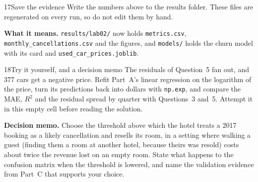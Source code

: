 
\begin{labquestion}{17}{Save the evidence}
Write the numbers above to the results folder. These files are regenerated on every run, so do not edit them by hand.
\end{labquestion}
\begin{labanswer}


\textbf{What it means.} \texttt{results/lab02/} now holds \texttt{metrics.csv}, \texttt{monthly\_cancellations.csv} and the figures, and \texttt{models/} holds the churn model with its card and \texttt{used\_car\_prices.joblib}.
\end{labanswer}


\begin{labquestion}{18}{Try it yourself, and a decision memo}
The residuals of Question~5 fan out, and 377 cars get a negative price. Refit Part~A's linear regression on the logarithm of the price, turn its predictions back into dollars with \texttt{np.exp}, and compare the MAE, $R^2$ and the residual spread by quarter with Questions~3 and~5. Attempt it in this empty cell before reading the solution.

\textbf{Decision memo.} Choose the threshold above which the hotel treats a 2017 booking as a likely cancellation and resells its room, in a setting where walking a guest (finding them a room at another hotel, because theirs was resold) costs about twice the revenue lost on an empty room. State what happens to the confusion matrix when the threshold is lowered, and name the validation evidence from Part~C that supports your choice.
\end{labquestion}

